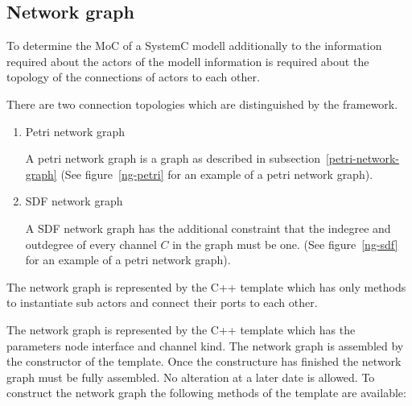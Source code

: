 \subsection{Network graph}

To determine the MoC of a SystemC modell additionally to the information
required about the actors of the modell information is required about the
topology of the connections of actors to each other.

There are two connection topologies which are distinguished by the \SysteMoC{}
framework.

\begin{enumerate}
\item Petri network graph
  
  A petri network graph is a graph as described in subsection~\ref{petri-network-graph}
  (See figure~\ref{ng-petri} for an example of a petri network graph).

\item SDF network graph
  
  A SDF network graph has the additional constraint that the indegree and outdegree
  of every channel $C$ in the graph must be one.
  (See figure~\ref{ng-sdf} for an example of a petri network graph).

\end{enumerate}

The network graph is represented by the C++ template  
which has only methods to instantiate sub actors and connect their ports to each other.

The network graph is represented by the C++ template
 which has the parameters node interface
and channel kind. The network graph is assembled by the
constructor of the   template.
Once the constructure has finished the network graph must
be fully assembled. No alteration at a later date is allowed.
To construct the network graph the following methods of the
 template are available:


